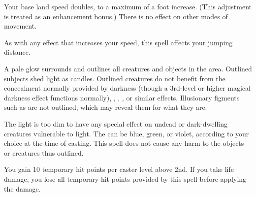 \spellrng{\rngclose}
\begin{spelleffect}
  Your base land speed doubles, to a maximum of a  foot increase. (This adjustment is treated as an enhancement bonus.) There is no effect on other modes of movement.
\end{spelleffect}
\begin{spellnotes}
 As with any effect that increases your speed, this spell affects your jumping distance.
 \end{spellnotes}

\begin{comment}
\subsubsection{F}
\end{comment}

\spellrng{\rngmed}
\begin{spelleffect}
  A pale glow surrounds and outlines all creatures and objects in the area. Outlined subjects shed light as candles. Outlined creatures do not benefit from the concealment normally provided by darkness (though a 3rd-level or higher magical darkness effect functions normally), , , , or similar effects. Illusionary figments such as  are not outlined, which may reveal them for what they are.
  
  The light is too dim to have any special effect on undead or dark-dwelling creatures vulnerable to light. The  can be blue, green, or violet, according to your choice at the time of casting. This spell does not cause any harm to the objects or creatures thus outlined.
\end{spelleffect}

\spellrng{\rngpers}
\spelldur{\durshort}
\begin{spelleffect}
  You gain 10 temporary hit points  per caster level above 2nd. If you take life damage, you lose all temporary hit points provided by this spell before applying the damage.
\end{spelleffect}

